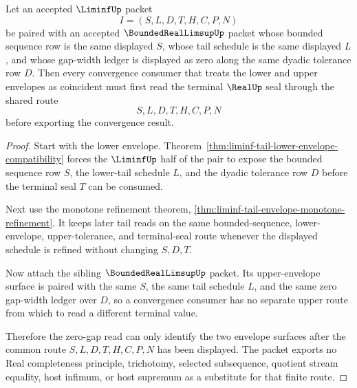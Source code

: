 \begin{theorem}
\label{thm:liminf-limsup-zero-gap-convergence}
Let an accepted $\LiminfUp$ packet
$$
I=(S,L,D,T,H,C,P,N)
$$
be paired with an accepted $\BoundedRealLimsupUp$ packet whose bounded sequence row is the same displayed $S$, whose tail schedule is the same displayed $L$, and whose gap-width ledger is displayed as zero along the same dyadic tolerance row $D$. Then every convergence consumer that treats the lower and upper envelopes as coincident must first read the terminal $\RealUp$ seal through the shared route
$$
S,L,D,T,H,C,P,N
$$
before exporting the convergence result.
\end{theorem}
\begin{proof}
Start with the lower envelope. Theorem~\ref{thm:liminf-tail-lower-envelope-compatibility} forces the $\LiminfUp$ half of the pair to expose the bounded sequence row $S$, the lower-tail schedule $L$, and the dyadic tolerance row $D$ before the terminal seal $T$ can be consumed.

Next use the monotone refinement theorem, \autoref{thm:liminf-tail-envelope-monotone-refinement}. It keeps later tail reads on the same bounded-sequence, lower-envelope, upper-tolerance, and terminal-seal route whenever the displayed schedule is refined without changing $S,D,T$.

Now attach the sibling $\BoundedRealLimsupUp$ packet. Its upper-envelope surface is paired with the same $S$, the same tail schedule $L$, and the same zero gap-width ledger over $D$, so a convergence consumer has no separate upper route from which to read a different terminal value.

Therefore the zero-gap read can only identify the two envelope surfaces after the common route $S,L,D,T,H,C,P,N$ has been displayed. The packet exports no Real completeness principle, trichotomy, selected subsequence, quotient stream equality, host infimum, or host supremum as a substitute for that finite route.
\end{proof}

